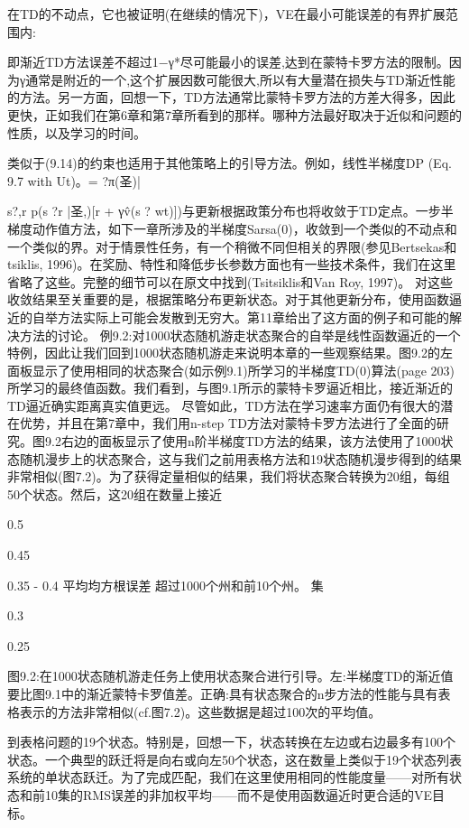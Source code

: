 在TD的不动点，它也被证明(在继续的情况下)，VE在最小可能误差的有界扩展范围内:
 
即渐近TD方法误差不超过1−γ*尽可能最小的误差,达到在蒙特卡罗方法的限制。因为γ通常是附近的一个,这个扩展因数可能很大,所以有大量潜在损失与TD渐近性能的方法。另一方面，回想一下，TD方法通常比蒙特卡罗方法的方差大得多，因此更快，正如我们在第6章和第7章所看到的那样。哪种方法最好取决于近似和问题的性质，以及学习的时间。

类似于(9.14)的约束也适用于其他策略上的引导方法。例如，线性半梯度DP (Eq. 9.7 with Ut)。= ?π(圣)|

s?,r p(s ?r |圣,)[r +
γv̂(s ? wt)])与更新根据政策分布也将收敛于TD定点。一步半梯度动作值方法，如下一章所涉及的半梯度Sarsa(0)，收敛到一个类似的不动点和一个类似的界。对于情景性任务，有一个稍微不同但相关的界限(参见Bertsekas和tsiklis, 1996)。在奖励、特性和降低步长参数方面也有一些技术条件，我们在这里省略了这些。完整的细节可以在原文中找到(Tsitsiklis和Van Roy, 1997)。
对这些收敛结果至关重要的是，根据策略分布更新状态。对于其他更新分布，使用函数逼近的自举方法实际上可能会发散到无穷大。第11章给出了这方面的例子和可能的解决方法的讨论。
例9.2:对1000状态随机游走状态聚合的自举是线性函数逼近的一个特例，因此让我们回到1000状态随机游走来说明本章的一些观察结果。图9.2的左面板显示了使用相同的状态聚合(如示例9.1)所学习的半梯度TD(0)算法(page 203)所学习的最终值函数。我们看到，与图9.1所示的蒙特卡罗逼近相比，接近渐近的TD逼近确实距离真实值更远。
尽管如此，TD方法在学习速率方面仍有很大的潜在优势，并且在第7章中，我们用n-step TD方法对蒙特卡罗方法进行了全面的研究。图9.2右边的面板显示了使用n阶半梯度TD方法的结果，该方法使用了1000状态随机漫步上的状态聚合，这与我们之前用表格方法和19状态随机漫步得到的结果非常相似(图7.2)。为了获得定量相似的结果，我们将状态聚合转换为20组，每组50个状态。然后，这20组在数量上接近
 
0.5



0.45




0.35 - 0.4
平均均方根误差
超过1000个州和前10个州。
集

0.3



0.25
 


图9.2:在1000状态随机游走任务上使用状态聚合进行引导。左:半梯度TD的渐近值要比图9.1中的渐近蒙特卡罗值差。正确:具有状态聚合的n步方法的性能与具有表格表示的方法非常相似(cf.图7.2)。这些数据是超过100次的平均值。

到表格问题的19个状态。特别是，回想一下，状态转换在左边或右边最多有100个状态。一个典型的跃迁将是向右或向左50个状态，这在数量上类似于19个状态列表系统的单状态跃迁。为了完成匹配，我们在这里使用相同的性能度量——对所有状态和前10集的RMS误差的非加权平均——而不是使用函数逼近时更合适的VE目标。

